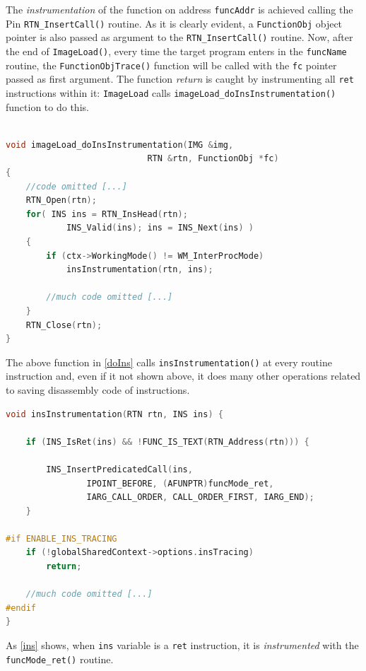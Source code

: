 \documentclass[a4paper,10pt]{report}
\begin{document}
\noindent
The \emph{instrumentation} of the function on address \verb|funcAddr| is achieved 
calling the Pin \verb|RTN_InsertCall()| routine. 
As it is clearly evident, a \verb|FunctionObj| object pointer is also passed as
argument to the \verb|RTN_InsertCall()| routine. 
Now, after the end of \verb|ImageLoad()|, every time the target program
enters in the \verb|funcName| routine, the \verb|FunctionObjTrace()| function 
will be called with the \verb|fc| pointer passed as first argument.
The function \emph{return} is caught by instrumenting all \verb|ret| instructions
within it: \verb|ImageLoad| calls \verb|imageLoad_doInsInstrumentation()| function
to do this. 

\begin{lstlisting}[language=C++, 
	caption={a fragment of \texttt{imageLoad\_doInsInstrumentation()} routine}, 
	label=doIns, frame=leftline]	

void imageLoad_doInsInstrumentation(IMG &img, 
							RTN &rtn, FunctionObj *fc) 
{
	//code omitted [...]
	RTN_Open(rtn);
	for( INS ins = RTN_InsHead(rtn); 
			INS_Valid(ins); ins = INS_Next(ins) ) 
	{
		if (ctx->WorkingMode() != WM_InterProcMode)
			insInstrumentation(rtn, ins);	

		//much code omitted [...]		
	}
	RTN_Close(rtn);
}
\end{lstlisting}

\noindent
The above function in \cref{doIns} calls \verb|insInstrumentation()| at every routine instruction and, even if it not shown above, it does many other operations 
related to saving disassembly code of instructions.

\begin{lstlisting}[language=C++, 
	caption={a fragment of \texttt{insInstrumentation()} routine}, 
	label=ins, frame=leftline]
void insInstrumentation(RTN rtn, INS ins) {

	if (INS_IsRet(ins) && !FUNC_IS_TEXT(RTN_Address(rtn))) {

		INS_InsertPredicatedCall(ins, 
				IPOINT_BEFORE, (AFUNPTR)funcMode_ret, 
				IARG_CALL_ORDER, CALL_ORDER_FIRST, IARG_END);
	}

#if ENABLE_INS_TRACING
	if (!globalSharedContext->options.insTracing)
		return;
	
	//much code omitted [...]	
#endif
}

\end{lstlisting}

\noindent
As \cref{ins} shows, when \verb|ins| variable is a \verb|ret| instruction,  
it is \emph{instrumented} with the \verb|funcMode_ret()| routine.
\end{document}

